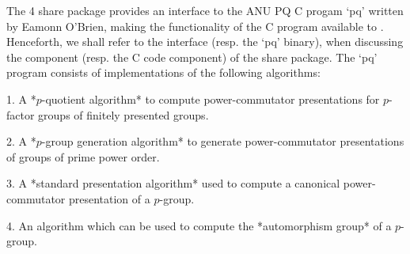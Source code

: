 

The {\GAP} 4 share package {\ANUPQ} provides an interface to the ANU PQ C
progam `pq' written by Eamonn O'Brien, making the functionality of the  C
program available to {\GAP}. Henceforth, we shall refer to  the  {\ANUPQ}
interface (resp. the `pq' binary), when discussing the  {\GAP}  component
(resp. the C code component) of the  {\ANUPQ}  share  package.  The  `pq'
program consists of implementations of the following algorithms:

\beginlist

\item{1.}
A *$p$-quotient algorithm* to compute power-commutator presentations  for
$p$-factor groups of finitely presented groups.


\item{2.} 
A  *$p$-group  generation   algorithm*   to   generate   power-commutator
presentations of groups of prime power order.


\item{3.}
A  *standard  presentation  algorithm*  used  to  compute   a   canonical
power-commutator presentation of a $p$-group.


\item{4.} 
An algorithm which can be used to compute the *automorphism group*  of  a
$p$-group.


